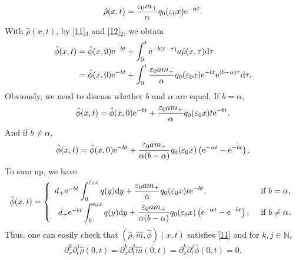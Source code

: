 \documentclass[11pt]{article}
\theoremstyle{plain}
\numberwithin{equation}{section}
\begin{document}
	\begin{equation}\notag
		\hat\rho(x,t)=\frac{\varepsilon_{0}m_+}{\alpha}q_0(\varepsilon_{0}x){\rm e}^{-\alpha t}.
	\end{equation}
With $\hat\rho(x,t)$, by \eqref{11}$_3$ and \eqref{12}$_2$, we obtain
	\begin{align}\notag
		\hat\phi(x,t)&=\hat\phi(x,0){\rm e}^{-bt}+\int_{0}^{t}{\rm e}^{-b(t-\tau)}a\hat\rho(x,\tau){\rm d}\tau\notag\\
		&=\hat\phi(x,0){\rm e}^{-bt}+\int_{0}^{t}\frac{\varepsilon_{0}am_+}{\alpha}q_0(\varepsilon_{0}x){\rm e}^{-bt}{\rm e}^{(b-\alpha)\tau}{\rm d}\tau.\notag
	\end{align}
	Obviously, we need to discuss whether $b$ and $\alpha$ are equal.
	If $b=\alpha$,
	\[
	\hat\phi(x,t)=\hat\phi(x,0){\rm e}^{-bt}+\frac{\varepsilon_{0}am_+}{\alpha}q_0(\varepsilon_{0}x)t{\rm e}^{-bt}.\]
	And if $b\neq\alpha$, 
	\[
	\hat\phi(x,t)=\hat\phi(x,0){\rm e}^{-bt}+\frac{\varepsilon_{0}am_+}{\alpha(b-\alpha)}q_0(\varepsilon_{0}x)\left({\rm e}^{-\alpha t}-{\rm e}^{-bt}\right).\]
	To sum up, we have
	\begin{equation}\notag
		\hat\phi(x,t)=\left\{\begin{array}{cl}
			d_+{\rm e}^{-bt}\displaystyle\int_{0}^{\varepsilon_{0}x}q(y){\rm d}y+\displaystyle\frac{\varepsilon_{0}am_+}{\alpha}q_0(\varepsilon_{0}x)t{\rm e}^{-bt},~~~~~~~~~~~~~~~~~ & \textrm{if}\ b=\alpha,\\[3mm]
			d_+{\rm e}^{-bt}\displaystyle\int_{0}^{\varepsilon_{0}x}q(y){\rm d}y+\displaystyle\frac{\varepsilon_{0}am_+}{\alpha(b-\alpha)}q_0(\varepsilon_{0}x)\left({\rm e}^{-\alpha t}-{\rm e}^{-bt}\right), & \textrm{if}\ b\neq\alpha.
		\end{array}\right.
	\end{equation}
	Thus, one can easily check that $(\hat\rho,\hat m,\hat\phi)(x,t)$ satisfies \eqref{11} and for $k, j \in \mathbb{N}$,
	\begin{equation}\label{13a}
		\partial^{k}_{x}\partial^{j}_{t}\hat\rho(0,t)=\partial^{k}_{x}\partial^{j}_{t}\hat m(0,t)=\partial^{k}_{x}\partial^{j}_{t}\hat\phi(0,t)=0.
	\end{equation}
	
\end{document}
